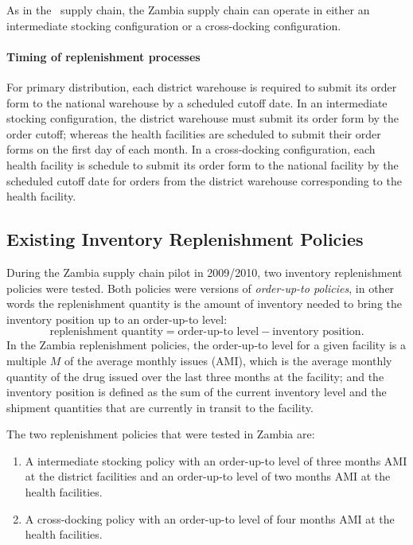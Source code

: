 As in the \scs\ supply chain,
the Zambia supply chain can operate in
either an intermediate stocking configuration
or a cross-docking configuration.

\paragraph{Timing of replenishment processes}
For primary distribution,
each district warehouse is required to submit its order form
to the national warehouse by a scheduled cutoff date.
In an intermediate stocking configuration,
the district warehouse must submit its order form by the order cutoff;
whereas the health facilities are scheduled to submit their order forms
on the first day of each month.
In a cross-docking configuration,
each health facility is schedule to submit its order form
to the national facility
by the scheduled cutoff date for orders from
the district warehouse corresponding to the health facility.






\subsection{Existing Inventory Replenishment Policies}

During the Zambia supply chain pilot in 2009/2010,
two inventory replenishment policies were tested.
Both policies were versions of \emph{order-up-to policies},
in other words the replenishment quantity is
the amount of inventory needed
to bring the inventory position
up to an order-up-to level:
\[
    \text{replenishment quantity}
  =
    \text{order-up-to level}
    - \text{inventory position}.
\]
In the Zambia replenishment policies,
the order-up-to level for a given facility
is a multiple $M$ of the average monthly issues (AMI),
which is the average monthly quantity of the drug
issued over the last three months at the facility;
and the inventory position is defined as the
sum of the current inventory level
and the shipment quantities that are currently in transit to the facility.

The two replenishment policies that were tested in Zambia are:
\begin{enumerate}
\item
A intermediate stocking policy
with an order-up-to level of three months AMI at the district facilities
and an order-up-to level of two months AMI at the health facilities.
\item
A cross-docking policy
with an order-up-to level of four months AMI at the health facilities.
\end{enumerate}






